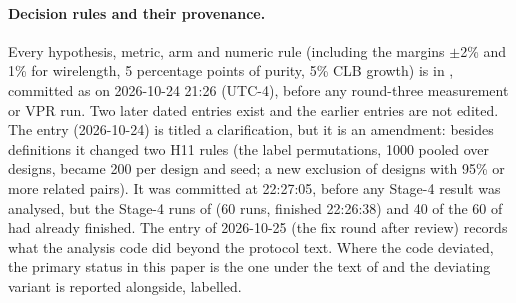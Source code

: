 \paragraph{Decision rules and their provenance.} Every hypothesis, metric, arm and numeric rule (including the margins
$\pm$2\% and 1\% for wirelength, 5 percentage points of purity, 5\% CLB growth) is in ,
committed as  on 2026-10-24 21:26 (UTC-4), before any round-three measurement or VPR run. Two later dated entries
exist and the earlier entries are not edited. The entry  (2026-10-24) is titled a clarification, but it is an
amendment: besides definitions it changed two H11 rules (the label permutations, 1000 pooled over designs, became 200 per
design and seed; a new exclusion of designs with 95\% or more related pairs). It was committed at 22:27:05, before any
Stage-4 result was analysed, but the Stage-4 runs of  (60 runs, finished 22:26:38) and 40 of the 60 of  had
already finished. The entry of 2026-10-25 (the fix round after review) records what the analysis code did beyond the
protocol text. Where the code deviated, the primary status in this paper is the one under the text of  and
the deviating variant is reported alongside, labelled.
